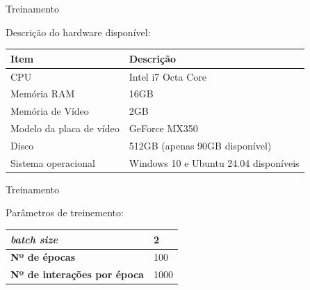 \documentclass{beamer}
\begin{document}
    \begin{frame}{Treinamento}{\thesection \, \secname}
        
        \centering

        Descrição do hardware disponível:

        \vspace{0.2cm}

        \begin{tabular}{|l|l|} \hline
            \textbf{Item}            & \textbf{Descrição}                    \\ \hline
            CPU                      & Intel i7 Octa Core                    \\ \hline
            Memória RAM              & 16GB                                  \\ \hline
            Memória de Vídeo         & 2GB                                   \\ \hline
            Modelo da placa de vídeo & GeForce MX350                         \\ \hline
            Disco                    & 512GB (apenas 90GB disponível)        \\ \hline
            Sistema operacional      & Windows 10 e Ubuntu 24.04 disponíveis  \\ \hline
        \end{tabular}
        
    \end{frame}

    \begin{frame}{Treinamento}{\thesection \, \secname}
        
        \centering
        
        Parâmetros de treinemento:

        \vspace{0.2cm}

        \begin{tabular}{|l|l|} \hline
            \textbf{\textit{batch size}}         & 2    \\ \hline
            \textbf{Nº de épocas}                & 100  \\ \hline
            \textbf{Nº de interações por época}  & 1000 \\ \hline 
        \end{tabular}

    \end{frame}
\end{document}
